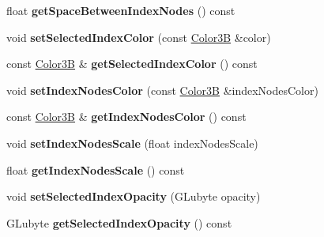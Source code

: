 \begin{DoxyCompactItemize}
\item 
\mbox{\label{classui_1_1PageViewIndicator_af39a3ced3158146467d3735406cd46a1}} 
float {\bfseries get\+Space\+Between\+Index\+Nodes} () const
\item 
\mbox{\label{classui_1_1PageViewIndicator_af942935ddf0ab349958502321c4fad36}} 
void {\bfseries set\+Selected\+Index\+Color} (const \hyperlink{structColor3B}{Color3B} \&color)
\item 
\mbox{\label{classui_1_1PageViewIndicator_a6cf78bca571bafababb16cf38dc28362}} 
const \hyperlink{structColor3B}{Color3B} \& {\bfseries get\+Selected\+Index\+Color} () const
\item 
\mbox{\label{classui_1_1PageViewIndicator_a1c305b6412c091e80767304a2f6002c7}} 
void {\bfseries set\+Index\+Nodes\+Color} (const \hyperlink{structColor3B}{Color3B} \&index\+Nodes\+Color)
\item 
\mbox{\label{classui_1_1PageViewIndicator_a20657be108a6037b57f42079660fdba4}} 
const \hyperlink{structColor3B}{Color3B} \& {\bfseries get\+Index\+Nodes\+Color} () const
\item 
\mbox{\label{classui_1_1PageViewIndicator_a20bc159b9393e706dd789a5ac51890ba}} 
void {\bfseries set\+Index\+Nodes\+Scale} (float index\+Nodes\+Scale)
\item 
\mbox{\label{classui_1_1PageViewIndicator_a8e208860fc283da773ad211ea10f5f87}} 
float {\bfseries get\+Index\+Nodes\+Scale} () const
\item 
\mbox{\label{classui_1_1PageViewIndicator_aeb85fb015088db2b088eee78e76ca93b}} 
void {\bfseries set\+Selected\+Index\+Opacity} (G\+Lubyte opacity)
\item 
\mbox{\label{classui_1_1PageViewIndicator_a6d8fde0fc1b48151095761c70c2f02de}} 
G\+Lubyte {\bfseries get\+Selected\+Index\+Opacity} () const
\item 
\mbox{\label{classui_1_1PageViewIndicator_a412ce1c007efde80fb9c89fa53ae598b}} 

\end{DoxyCompactItemize}
